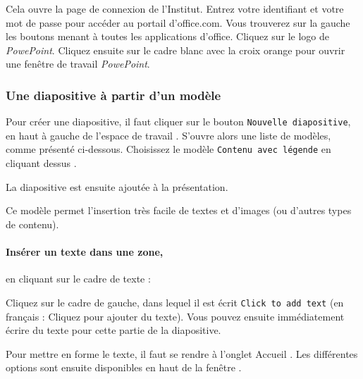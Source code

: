 
Cela ouvre la page de connexion de l'Institut. Entrez votre identifiant et votre mot de passe pour accéder au portail d'office.com. Vous trouverez sur la gauche les boutons menant à toutes les applications d'office. Cliquez sur le logo de \emph{PowePoint}. Cliquez ensuite sur le cadre blanc avec la croix orange pour ouvrir une fenêtre de travail \emph{PowePoint}.






\subsubsection{Une diapositive à partir d'un modèle}\label{Presentation1diapoModele}

Pour créer une diapositive, il faut cliquer sur le bouton \texttt{Nouvelle diapositive}, en haut à gauche de l'espace de travail . S'ouvre alors une liste de modèles, comme présenté ci-dessous. Choisissez le modèle \texttt{Contenu avec légende} en cliquant dessus .




La diapositive est ensuite ajoutée à la présentation.


Ce modèle permet l'insertion très facile de textes et d'images (ou d'autres types de contenu).


\paragraph{Insérer un texte dans une zone,}\label{texteZone} en cliquant sur le cadre de texte :

Cliquez sur le cadre de gauche, dans lequel il est écrit \texttt{Click to add text} (en français : Cliquez pour ajouter du texte). Vous pouvez ensuite immédiatement écrire du texte pour cette partie de la diapositive.

Pour mettre en forme le texte, il faut se rendre à l'onglet Accueil . Les différentes options sont ensuite disponibles en haut de la fenêtre .

